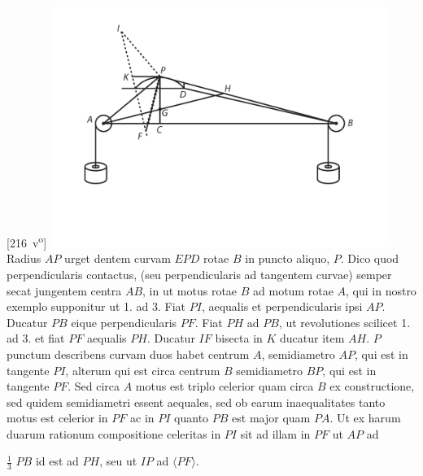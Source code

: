 [216~v\textsuperscript{o}] 
\pend 
\vspace{2em}
\pstart
\centering
\includegraphics[width=0.83\textwidth]{images/LH03705_216v-d1.pdf}\\
\pend
\newpage
\count{}
\count{}
\count{}
\pstart Radius $AP$ urget dentem curvam $EPD$ rotae $B$ in puncto aliquo, $P$. Dico quod perpendicularis contactus, (seu perpendicularis ad tangentem curvae) semper secat jungentem centra $AB$, in  ut motus rotae $B$ ad motum rotae $A$,  qui in nostro exemplo supponitur ut 1. ad 3. Fiat $PI$, aequalis et perpendicularis ipsi $AP$. 
\pend 
\pstart Ducatur $PB$ eique perpendicularis $PF$. Fiat $PH$ ad $PB$, ut revolutiones scilicet 1. ad 3. et fiat $PF$ aequalis $PH$. Ducatur $IF$ bisecta in $K$ ducatur item $AH$. \pend \pstart $P$ punctum describens curvam duos habet  centrum $A$, semidiametro $AP$, qui est in tangente $PI$, alterum qui est circa centrum $B$ semidiametro $BP$, qui est in tangente $PF$. Sed circa $A$ motus est triplo celerior quam circa $B$ ex constructione, sed quidem semidiametri essent aequales, sed ob earum inaequalitates tanto motus est celerior in $PF$ ac in $PI$ quanto $PB$ est major quam $PA$. Ut ex harum duarum rationum compositione celeritas in $PI$ sit ad illam in $PF$ ut $AP$ ad \rule[-4mm]{0mm}{10mm}$\displaystyle\frac{1}{3}$ $PB$ id est ad $PH$, seu ut $IP$ ad $\langle PF \rangle$. 

